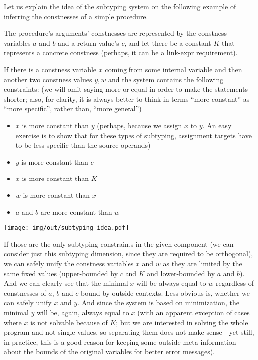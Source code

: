 \begin{ex}
\label{subtyping-idea}

Let us explain the idea of the subtyping system on the following example of inferring the constnesses of a simple procedure.

The procedure's arguments' constnesses are represented by the constness variables $a$ and $b$ and a return value's $c$, and let there be a constant $K$ that represents a concrete constness (perhaps, it can be a link-expr requirement).

If there is a constness variable $x$ coming from some internal variable and then another two constness values $y, w$ and the system contains the following constraints: (we will omit saying more-or-equal in order to make the statements shorter; also, for clarity, it is always better to think in terms ``more constant'' as ``more specific'', rather than, ``more general'')

\begin{itemize}
    \item $x$ is more constant than $y$ (perhaps, because we assign $x$ to $y$. An easy exercise is to show that for these types of subtyping, assignment targets have to be less specific than the source operands)
    \item $y$ is more constant than $c$
    \item $x$ is more constant than $K$
    \item $w$ is more constant than $x$
    \item $a$ and $b$ are more constant than $w$
\end{itemize}

\centerline{\texttt{[image: img/out/subtyping-idea.pdf]}}

If those are the only subtyping constraints in the given component (we can consider just this subtyping dimension, since they are required to be orthogonal), we can safely unify the constness variables $x$ and $w$ as they are limited by the same fixed values (upper-bounded by $c$ and $K$ and lower-bounded by $a$ and $b$). And we can clearly see that the minimal $x$ will be always equal to $w$ regardless of constnesses of $a$, $b$ and $c$ bound by outside contexts. Less obvious is, whether we can safely unify $x$ and $y$. And since the system is based on minimization, the minimal $y$ will be, again, always equal to $x$ (with an apparent exception of cases where $x$ is not solvable because of $K$; but we are interested in solving the whole program and not single values, so separating them does not make sense - yet still, in practice, this is a good reason for keeping some outside meta-information about the bounds of the original variables for better error messages).


\end{ex}
